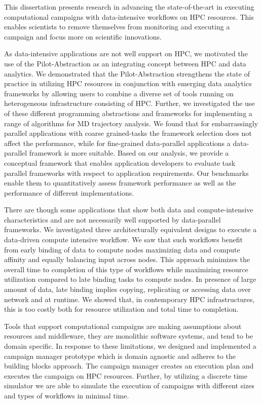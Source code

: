 \label{ch:conclusions}

This dissertation presents research in advancing the state-of-the-art in executing computational campaigns with data-intensive workflows on HPC resources.
This enables scientists to remove themselves from monitoring and executing a campaign and focus more on scientific innovations.

As data-intensive applications are not well support on HPC, we motivated the use of the Pilot-Abstraction as an integrating concept between HPC and data analytics.
We demonstrated that the Pilot-Abstraction strengthens the state of practice in utilizing HPC resources in conjunction with emerging data analytics frameworks by allowing users to combine a diverse set of tools running on heterogeneous infrastructure consisting of HPC.
Further, we investigated the use of these different programming abstractions and frameworks for implementing a range of algorithms for MD trajectory analysis. 
We found that for embarrassingly parallel applications with coarse grained-tasks the framework selection does not affect the performance, while for fine-grained data-parallel applications a data-parallel framework is more suitable.
Based on our analysis, we provide a conceptual framework that enables application developers to evaluate task parallel frameworks with respect to application requirements. 
Our benchmarks enable them to quantitatively assess framework performance as well as the performance of different implementations. 

There are though some applications that show both data and compute-intensive characteristics and are not necessarily well supported by data-parallel frameworks.
We investigated three architecturally equivalent designs to execute a data-driven compute intensive workflow.
We saw that such workflows benefit from early binding of data to compute nodes maximizing data and compute affinity and equally balancing input across nodes.
This approach minimizes the overall time to completion of this type of workflows while maximizing resource utilization compared to late binding tasks to compute nodes.
In presence of large amount of data, late binding implies copying, replicating or accessing data over network and at runtime.
We showed that, in contemporary HPC infrastructures, this is too costly both for resource utilization and total time to completion.

Tools that support computational campaigns are making assumptions about resources and middleware, they are monolithic software systems, and tend to be domain specific.
In response to these limitations, we designed and implemented a campaign manager prototype which is domain agnostic and adheres to the building blocks approach.
The campaign manager creates an execution plan and executes the campaign on HPC resources.
Further, by utilizing a discrete time simulator we are able to simulate the execution of campaigns with different sizes and types of workflows in minimal time.

